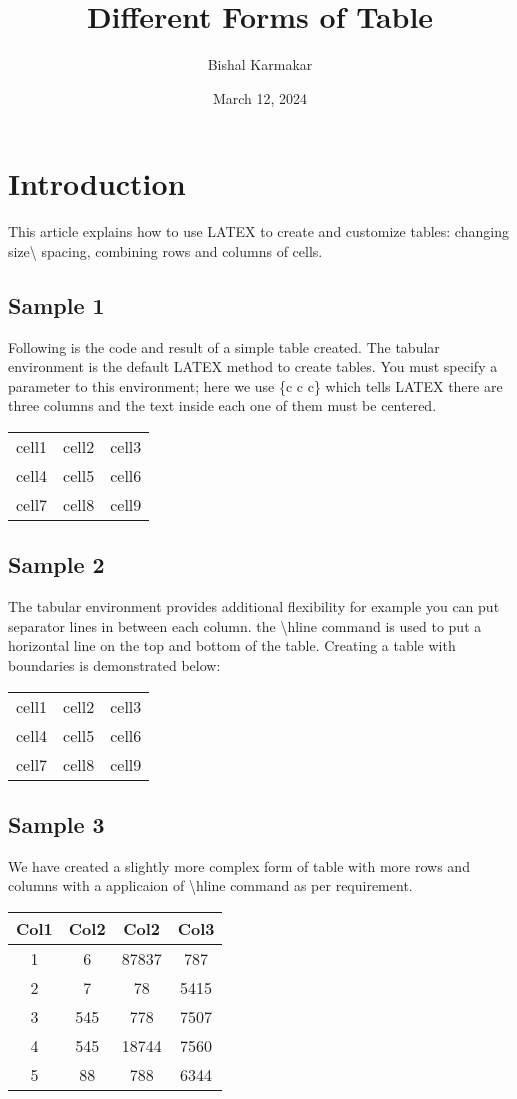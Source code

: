 \documentclass{article}
\title{Different Forms of Table} \author{Bishal Karmakar} \date{March 12, 2024}
\begin{document}
\maketitle
\section{Introduction}
This article explains how to use LATEX to create and customize tables: changing size\textbackslash 
spacing, combining rows and columns of cells.
\subsection{Sample 1}
Following is the code and result of a simple table created. The tabular environment is the default 
LATEX method to create tables. You must specify a parameter to this environment; here we use \{c 
c c\} which tells LATEX there are three columns and the text inside each one of them must be 
centered.
\begin{center}
\begin{tabular}{c c c}
cell1 & cell2 & cell3\\
cell4 & cell5 & cell6\\
cell7 & cell8 & cell9\\
\end{tabular}
\end{center}
\subsection{Sample 2}
The tabular environment provides additional flexibility for example you can put separator lines in 
between each column. the \textbackslash hline command is used to put a horizontal line on the top 
and bottom of the table. Creating a table with boundaries is demonstrated below:
\begin{center}
\begin{tabular}{ |c|c|c| } 
\hline
cell1 & cell2 & cell3 \\
cell4 & cell5 & cell6 \\
cell7 & cell8 & cell9 \\
\hline
\end{tabular}
\end{center}
\subsection{Sample 3}
We have created a slightly more complex form of table with more rows and columns with a 
applicaion of \textbackslash hline command as per requirement.
\begin{center}
\begin{tabular}{|c c c c|} 
\hline
Col1 & Col2 & Col2 & Col3 \\ [0.5ex] 
\hline\hline
1 & 6 & 87837 & 787 \\
\hline
2 & 7 & 78 & 5415 \\
\hline
3 & 545 & 778 & 7507 \\
\hline
4 & 545 & 18744 & 7560 \\
\hline
5 & 88 & 788 & 6344 \\ [1ex] 
\hline
\end{tabular}
\end{center}
\end{document}
